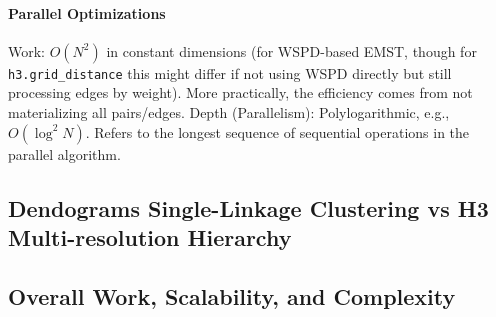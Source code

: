 \paragraph{Parallel Optimizations}
 Work: $O(N^2)$ in constant dimensions (for WSPD-based EMST, though for \texttt{h3.grid\_distance} this might differ if not using WSPD directly but still processing edges by weight). More practically, the efficiency comes from not materializing all pairs/edges.
Depth (Parallelism): Polylogarithmic, e.g., $O(\log^2 N)$. Refers to the longest sequence of sequential operations in the parallel algorithm. 

\subsection{Dendograms Single-Linkage Clustering vs H3 Multi-resolution Hierarchy}


\subsection{Overall Work, Scalability, and Complexity}


